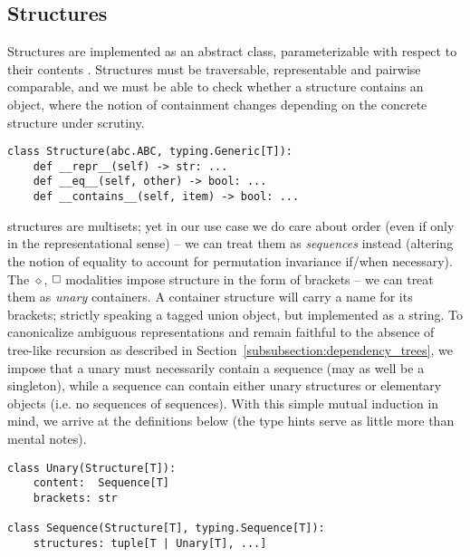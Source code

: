 \subsection{Structures}
Structures are implemented as an abstract class, parameterizable with respect to their contents .
Structures must be traversable, representable and pairwise comparable, and we must be able to check whether a structure contains an object, where the notion of containment changes depending on the concrete structure under scrutiny.

\begin{verbatim}
class Structure(abc.ABC, typing.Generic[T]):
	def __repr__(self) -> str: ...
	def __eq__(self, other) -> bool: ...
	def __contains__(self, item) -> bool: ...
\end{verbatim}

\noindent\LP{} structures are multisets; yet in our use case we do care about order (even if only in the representational sense) -- we can treat them as \textit{sequences} instead (altering the notion of equality to account for permutation invariance if/when necessary).
The $\diamond$, $\bx$ modalities impose structure in the form of brackets -- we can treat them as \textit{unary} containers.
A container structure will carry a name for its brackets; strictly speaking a tagged union object, but implemented as a string.
To canonicalize ambiguous representations and remain faithful to the absence of tree-like recursion as described in Section~\ref{subsubsection:dependency_trees}, we impose that a unary must necessarily contain a sequence (may as well be a singleton), while a sequence can contain either unary structures or elementary objects (i.e. no sequences of sequences).
With this simple mutual induction in mind, we arrive at the definitions below (the type hints serve as little more than mental notes).

\begin{verbatim}
class Unary(Structure[T]):
	content:  Sequence[T]
	brackets: str

class Sequence(Structure[T], typing.Sequence[T]):
	structures: tuple[T | Unary[T], ...]
\end{verbatim}

